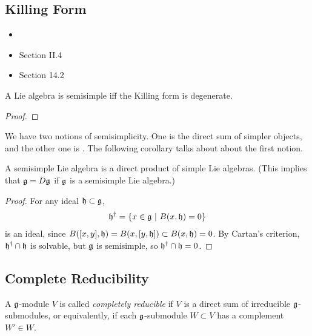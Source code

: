 \subsection{Killing Form}
\label{sub:killing_form}

\begin{itemize}
    \makethislistcompact
    \item {}
    \item \cite{humphreys1972introduction} Section II.4
    \item \cite{fulton_representation_1991} Section 14.2
\end{itemize}


\begin{proposition}
    A Lie algebra is semisimple iff the Killing form is degenerate.
\end{proposition}
\begin{proof}
\end{proof}

We have two notions of semisimplicity. One is the direct sum of simpler objects, and the other one is . The following corollary talks about about the first notion.
\begin{corollary}
   A semisimple Lie algebra is a direct product of simple Lie algebras. (This implies that $\mathfrak{g}=D\mathfrak{g}$ if $\mathfrak{g}$ is a semisimple Lie algebra.)
\end{corollary}
\begin{proof}
    For any ideal $\mathfrak{h} \subset \mathfrak{g}$, 
    \begin{align}
        \mathfrak{h}^\dagger = \{x\in \mathfrak{g}\ |\  B(x,\mathfrak{h})=0 \}
    \end{align}
    is an ideal, since $ B([x,y],\mathfrak{h}) = B(x,[y,\mathfrak{h}]) \subset B(x,\mathfrak{h}) = 0$. By Cartan's criterion, $\mathfrak{h}^\dagger\cap \mathfrak{h}$ is solvable, but $\mathfrak{g}$ is semisimple, so $\mathfrak{h}^\dagger\cap\mathfrak{h}=0$. 
\end{proof}


\subsection{Complete Reducibility}
\label{sub:complete_reducibility}
A $\mathfrak{g}$-module $V$ is called \emph{completely reducible} if $V$ is a direct sum of irreducible $\mathfrak{g}$-submodules, or equivalently, if each $\mathfrak{g}$-submodule $W\subset V$ has a complement $W'\in W$.




